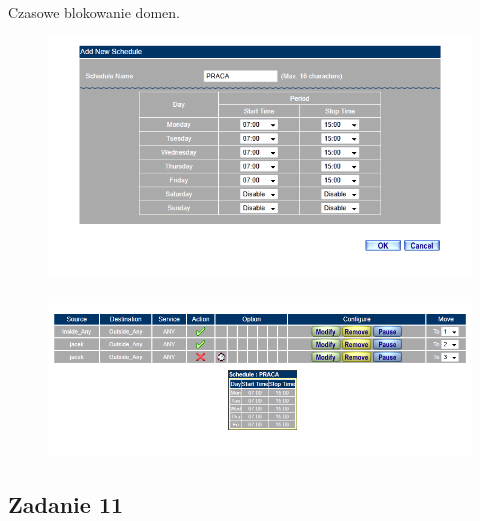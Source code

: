 \documentclass[wide,a4paper,titlepage,12pt] {article}
\begin{document}
  \paragraph{}
  Czasowe blokowanie domen.
  \begin{figure}[h!]
    \begin{center}
      \includegraphics[width=\textwidth]{10.PNG}
    \end{center}
  \end{figure}
  \begin{figure}[h!]
    \begin{center}
      \includegraphics[width=\textwidth]{11.PNG}
    \end{center}
  \end{figure}

  \subsection{Zadanie 11}
\end{document}
